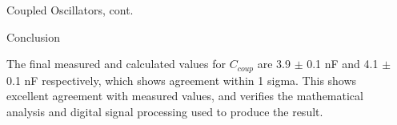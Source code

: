 \documentclass[final]{beamer}
\newlength{\sepwid}
\newlength{\onecolwid}
\begin{document}
\begin{frame}[t]
\begin{columns}[t]
\begin{column}{\onecolwid}
\begin{block}{Coupled Oscillators, cont.}
\end{block}

\begin{block}{Conclusion}

	The final measured and calculated values for $C_{coup}$ 
	are 3.9 $\pm$ 0.1 nF and 4.1 $\pm$ 0.1 nF respectively,
	which shows agreement within 1 sigma. This shows
	excellent agreement with measured values, and verifies
	the mathematical analysis and digital signal processing
	used to produce the result.

\end{block}

\end{column}

  \begin{column}{\sepwid}\end{column}			%

 \end{columns}

\end{frame}
\end{document}

